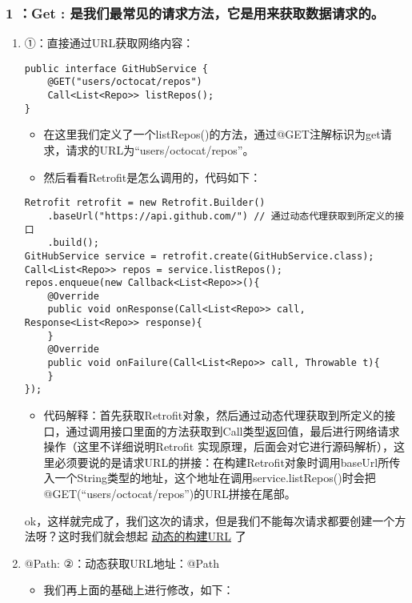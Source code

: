\documentclass[9pt, b5paper]{article}
\begin{document}
\subsubsection{1 ：Get : 是我们最常见的请求方法，它是用来获取数据请求的。}
\label{sec-1-2-1}
\begin{enumerate}
\item ①：直接通过URL获取网络内容：
\label{sec-1-2-1-1}
\begin{verbatim}
public interface GitHubService {
    @GET("users/octocat/repos")
    Call<List<Repo>> listRepos();
}
\end{verbatim}
\begin{itemize}
\item 在这里我们定义了一个listRepos()的方法，通过@GET注解标识为get请求，请求的URL为“users/octocat/repos”。
\item 然后看看Retrofit是怎么调用的，代码如下：
\end{itemize}
\begin{verbatim}
Retrofit retrofit = new Retrofit.Builder()
    .baseUrl("https://api.github.com/") // 通过动态代理获取到所定义的接口
    .build();
GitHubService service = retrofit.create(GitHubService.class);
Call<List<Repo>> repos = service.listRepos();
repos.enqueue(new Callback<List<Repo>>(){
    @Override
    public void onResponse(Call<List<Repo>> call, Response<List<Repo>> response){
    }
    @Override
    public void onFailure(Call<List<Repo>> call, Throwable t){
    }
});
\end{verbatim}
\begin{itemize}
\item 代码解释：首先获取Retrofit对象，然后通过动态代理获取到所定义的接口，通过调用接口里面的方法获取到Call类型返回值，最后进行网络请求操作（这里不详细说明Retrofit 实现原理，后面会对它进行源码解析），这里必须要说的是请求URL的拼接：在构建Retrofit对象时调用baseUrl所传入一个String类型的地址，这个地址在调用service.listRepos()时会把@GET(“users/octocat/repos”)的URL拼接在尾部。
\end{itemize}
ok，这样就完成了，我们这次的请求，但是我们不能每次请求都要创建一个方法呀？这时我们就会想起 \uline{动态的构建URL} 了
\item @Path: ②：动态获取URL地址：@Path
\label{sec-1-2-1-2}
\begin{itemize}
\item 我们再上面的基础上进行修改，如下：
\end{itemize}
\begin{verbatim}

\end{verbatim}
\end{enumerate}
\end{document}
